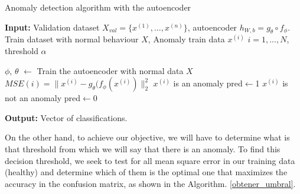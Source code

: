 \documentclass{iosart2c}
\begin{document}
\begin{algorithm}[h!]
\caption{Anomaly detection algorithm with the autoencoder}\label{autoencoder_anomalias}
\textbf{Input:} Validation dataset $X_{val}=\{x^{(1)},\ldots,x^{(n)}\}$, autoencoder $h_{W,b}=g_\theta \circ f_\phi$.\\ Train dataset with normal behaviour  $X$, Anomaly train data $x^{(i)}$ $i = 1,...,N$, threshold $\alpha$\\
\begin{algorithmic}[1]
\State $\phi$, $\theta$ $\xleftarrow{}$ Train the autoencoder with normal data $X$
    \State $MSE(i) = \lVert x^{(i)} - g_\theta(f_\phi(x^{(i)})\rVert_2^2$ 
        \State$x^{(i)}$ is an anomaly
        \State pred$\xleftarrow{}$1
    \Else 
        \State$x^{(i)}$ is not an anomaly
        \State pred$\xleftarrow{}$0
    \EndIf
\EndFor
\end{algorithmic}
\textbf{Output:} Vector of classifications.\\
\end{algorithm}


On the other hand, to achieve our objective, we will have to determine what is that threshold from which we will say that there is an anomaly. To find this decision threshold, we seek to test for all mean square error in our training data (healthy) and determine which of them is the optimal one that maximizes the accuracy in the confusion matrix, as shown in the Algorithm. \ref{obtener_umbral}.
\end{document}
